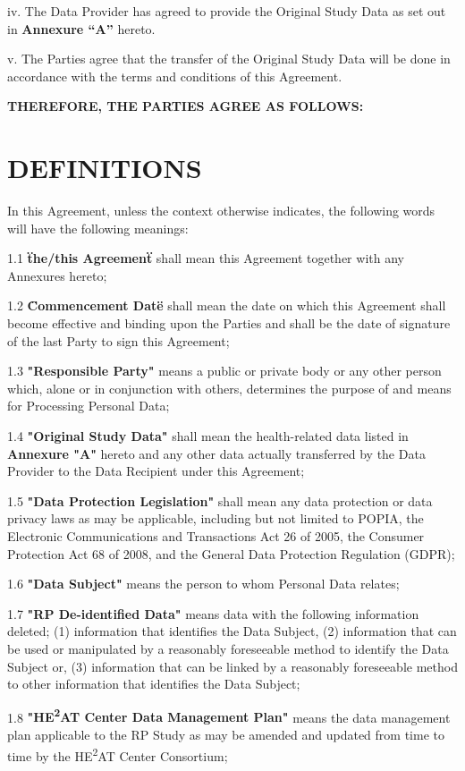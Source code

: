 iv. The Data Provider has agreed to provide the Original Study Data as set out in \textbf{Annexure ``A''} hereto.

v. The Parties agree that the transfer of the Original Study Data will be done in accordance with the terms and conditions of this Agreement.

\textbf{THEREFORE, THE PARTIES AGREE AS FOLLOWS:}

\section{DEFINITIONS}

In this Agreement, unless the context otherwise indicates, the following words will have the following meanings:

1.1 \textbf{\"the/this Agreement\"} shall mean this Agreement together with any Annexures hereto;

1.2 \textbf{\"Commencement Date\"} shall mean the date on which this Agreement shall become effective and binding upon the Parties and shall be the date of signature of the last Party to sign this Agreement;

1.3 \textbf{"Responsible Party"} means a public or private body or any other person which, alone or in conjunction with others, determines the purpose of and means for Processing Personal Data;

1.4 \textbf{"Original Study Data"} shall mean the health-related data listed in \textbf{Annexure "A"} hereto and any other data actually transferred by the Data Provider to the Data Recipient under this Agreement;

1.5 \textbf{"Data Protection Legislation"} shall mean any data protection or data privacy laws as may be applicable, including but not limited to POPIA, the Electronic Communications and Transactions Act 26 of 2005, the Consumer Protection Act 68 of 2008, and the General Data Protection Regulation (GDPR);

1.6 \textbf{"Data Subject"} means the person to whom Personal Data relates;

1.7 \textbf{"RP De-identified Data"} means data with the following information deleted; (1) information that identifies the Data Subject, (2) information that can be used or manipulated by a reasonably foreseeable method to identify the Data Subject or, (3) information that can be linked by a reasonably foreseeable method to other information that identifies the Data Subject;

1.8 \textbf{"HE\textsuperscript{2}AT Center Data Management Plan"} means the data management plan applicable to the RP Study as may be amended and updated from time to time by the HE\textsuperscript{2}AT Center Consortium;

